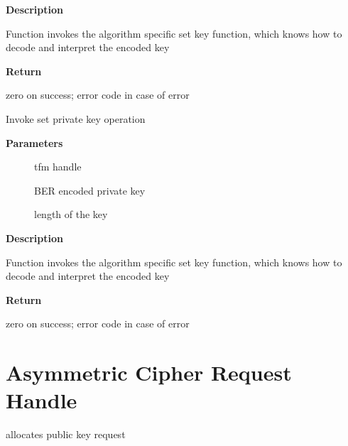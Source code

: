 \documentclass[a4paper,8pt,english]{sphinxmanual}
\begin{document}
\textbf{Description}

Function invokes the algorithm specific set key function, which knows
how to decode and interpret the encoded key

\textbf{Return}

zero on success; error code in case of error

\begin{fulllineitems}
\label{crypto/api-akcipher:c.crypto_akcipher_set_priv_key}
Invoke set private key operation

\end{fulllineitems}


\textbf{Parameters}
\begin{description}
\item[{}] \leavevmode
tfm handle

\item[{}] \leavevmode
BER encoded private key

\item[{}] \leavevmode
length of the key

\end{description}

\textbf{Description}

Function invokes the algorithm specific set key function, which knows
how to decode and interpret the encoded key

\textbf{Return}

zero on success; error code in case of error


\section{Asymmetric Cipher Request Handle}
\label{crypto/api-akcipher:asymmetric-cipher-request-handle}

\begin{fulllineitems}
\label{crypto/api-akcipher:c.akcipher_request_alloc}
allocates public key request

\end{fulllineitems}
\end{document}
